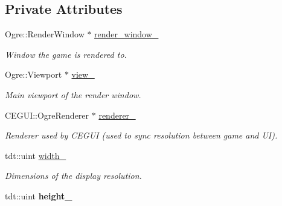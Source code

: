 \subsection*{Private Attributes}
\begin{DoxyCompactItemize}
\item 
Ogre\+::\+Render\+Window $\ast$ \hyperlink{class_options_window_a9c6b55b36d1f57ea60885cf0a59291ca}{render\+\_\+window\+\_\+}
\begin{DoxyCompactList}\small\item\em Window the game is rendered to. \end{DoxyCompactList}\item 
Ogre\+::\+Viewport $\ast$ \hyperlink{class_options_window_a8c3609894e71264da13b88129d0a1f70}{view\+\_\+}
\begin{DoxyCompactList}\small\item\em Main viewport of the render window. \end{DoxyCompactList}\item 
C\+E\+G\+U\+I\+::\+Ogre\+Renderer $\ast$ \hyperlink{class_options_window_aa46c54f3e0956dce55fb370324d91772}{renderer\+\_\+}
\begin{DoxyCompactList}\small\item\em Renderer used by C\+E\+G\+UI (used to sync resolution between game and UI). \end{DoxyCompactList}\item 
tdt\+::uint \hyperlink{class_options_window_ab5b2b96bd284265c5a49b145493e8ead}{width\+\_\+}
\begin{DoxyCompactList}\small\item\em Dimensions of the display resolution. \end{DoxyCompactList}\item 
tdt\+::uint {\bfseries height\+\_\+}\hypertarget{class_options_window_aa2b6e26908f2ee947a997d76de66cc6f}{}\label{class_options_window_aa2b6e26908f2ee947a997d76de66cc6f}


\end{DoxyCompactItemize}
